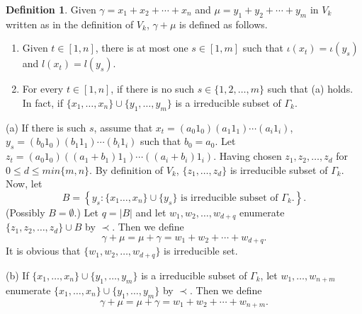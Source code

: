 \documentclass{amsart}
\theoremstyle{definition}
\newtheorem{definition}[theorem]{Definition}
\theoremstyle{remark}
\numberwithin{equation}{section}
\begin{document}
\begin{definition}{\label{3.366}}
	Given \( \gamma = x_1 + x_2 + \cdots + x_n \) and \( \mu = y_1 + y_2 + \cdots + y_m \) in \( V_k \) written as in the definition of \( V_k \), \( \gamma + \mu \) is defined as follows.
	\begin{enumerate}
		
		\item[(a)] 	Given \( t \in [1,n] \), there is at most one \( s \in [1,m] \) such that \( \iota(x_t) = \iota(y_s) \) and \( l(x_t) = l(y_s) \). 
		
		\item[(b)] For every \( t \in [1,n] \), if there is no such \( s \in \{1, 2, \ldots, m\} \) such that (a) holds. In fact, if  $\{x_1,\ldots,x_n\}\cup\{y_1,\ldots,y_m\}$ is a irreducible subset of $\Gamma_k$.
	\end{enumerate}
	(a) If there is such \( s \), assume that $x_t = (a_0 1_0)(a_1 1_1) \cdots (a_i 1_i)$, $ y_s = (b_0 1_0)(b_1 1_1) \cdots (b_i 1_i)$ such that \( b_0 = a_0 \). Let $z_t = (a_0 1_0)((a_1 + b_1) 1_1) \cdots ((a_i + b_i) 1_i)$. Having chosen \( z_1, z_2, \ldots, z_d \) for $0\leq d\leq min\{m,n\}$. By definition of $V_k$, $\{z_1,\ldots,z_d\}$ is irreducible subset of $\Gamma_k$. Now, let
	\[
	B = \left\{ y_s :\{x_1\ldots,x_n\}\cup\{y_s\}\text{ is irreducible subset of }\Gamma_k. \right\}.
	\]
	(Possibly \( B = \emptyset \).) 	Let \( q = |B| \) and let \( w_1, w_2, \ldots, w_{d+q} \) enumerate \( \{z_1, z_2, \ldots, z_d\} \cup B \) by $\prec$. Then we define
	\[
	\gamma + \mu = \mu + \gamma = w_1 + w_2 + \cdots + w_{d+q}.
	\]
	It is obvious that $\{w_1,w_2,\ldots,w_{d+q}\}$ is irreducible set.
	
	(b) If $\{x_1,\ldots,x_n\}\cup\{y_1,\ldots,y_m\}$ is a irreducible subset of $\Gamma_k$, let $w_1,\ldots,w_{n+m}$ enumerate $\{x_1,\ldots,x_n\}\cup\{y_1,\ldots,y_m\}$ by $\prec$. Then we define 
	\[
	\gamma+\mu=\mu+\gamma=w_1+w_2+\cdots+w_{n+m}.
	\]
\end{definition}
 
\end{document}
